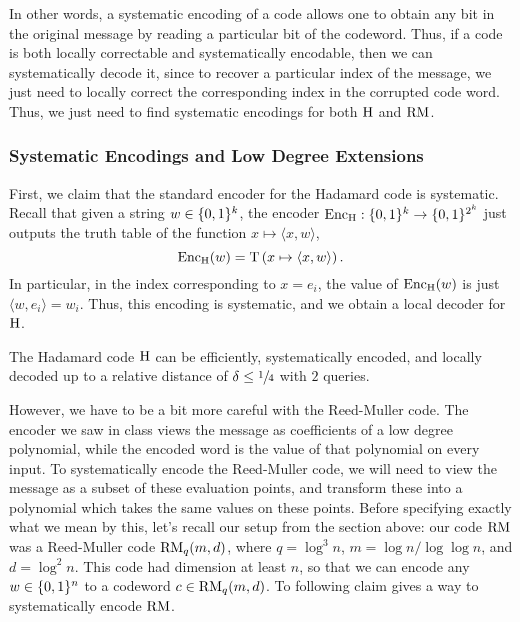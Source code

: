 \documentclass[11pt]{article}
\begin{document}
In other words, a systematic encoding of a code allows one to obtain any bit in the original message by reading a particular bit of the codeword. Thus, if a code is both locally correctable and systematically encodable, then we can systematically decode it, since to recover a particular index of the message, we just need to locally correct the corresponding index in the corrupted code word. Thus, we just need to find systematic encodings for both $\mathrm{H}$ and $\mathrm{RM}$.

\subsubsection{Systematic Encodings and Low Degree Extensions}

First, we claim that the standard encoder for the Hadamard code is systematic. Recall that given a string $w \in \{0, 1\}^k$, the encoder $\mathrm{Enc}_{\mathrm{H}} : \{0, 1\}^k \rightarrow \{0, 1\}^{2^k}$ just outputs the truth table of the function $x \mapsto \langle x, w \rangle$,
\begin{equation*}
    \mathrm{Enc}_{\mathrm{H}} (w) = \mathrm{T}\left(x \mapsto \langle x, w \rangle\right).
\end{equation*}
In particular, in the index corresponding to $x = e_i$, the value of $\mathrm{Enc}_{\mathrm{H}}(w)$ is just $\langle w, e_i \rangle = w_i$. Thus, this encoding is systematic, and we obtain a local decoder for $\mathrm{H}$.

\begin{claim}{2.4}
    The Hadamard code $\mathrm{H}$ can be efficiently, systematically encoded, and locally decoded up to a relative distance of $\delta \leq \sfrac{1}{4}$ with $2$ queries.
\end{claim}

However, we have to be a bit more careful with the Reed-Muller code. The encoder we saw in class views the message as coefficients of a low degree polynomial, while the encoded word is the value of that polynomial on every input. To systematically encode the Reed-Muller code, we will need to view the message as a subset of these evaluation points, and transform these into a polynomial which takes the same values on these points. Before specifying exactly what we mean by this, let's recall our setup from the section above: our code $\mathrm{RM}$ was a Reed-Muller code $\mathrm{RM}_q(m, d)$, where $q = \log^3 n$, $m = \log n / \log \log n$, and $d = \log^2 n$. This code had dimension at least $n$, so that we can encode any $w \in \{0, 1\}^n$ to a codeword $c \in \mathrm{RM}_q(m, d)$. To following claim gives a way to systematically encode $\mathrm{RM}$.
\end{document}
